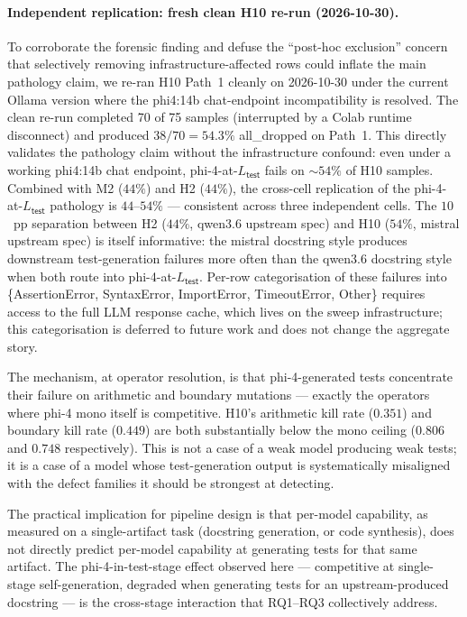 \paragraph{Independent replication: fresh clean H10 re-run (2026-10-30).}
To corroborate the forensic finding and defuse the ``post-hoc exclusion'' concern that selectively removing infrastructure-affected rows could inflate the main pathology claim, we re-ran H10 Path~1 cleanly on 2026-10-30 under the current Ollama version where the phi4:14b chat-endpoint incompatibility is resolved. The clean re-run completed 70 of 75 samples (interrupted by a Colab runtime disconnect) and produced $38/70 = 54.3\%$ \textsf{all\_dropped} on Path~1. This directly validates the pathology claim without the infrastructure confound: even under a working phi4:14b chat endpoint, phi-4-at-$L_{\textsf{test}}$ fails on $\sim$$54\%$ of H10 samples. Combined with M2 ($44\%$) and H2 ($44\%$), the cross-cell replication of the phi-4-at-$L_{\textsf{test}}$ pathology is $44$--$54\%$ --- consistent across three independent cells. The $10$~pp separation between H2 ($44\%$, qwen3.6 upstream spec) and H10 ($54\%$, mistral upstream spec) is itself informative: the mistral docstring style produces downstream test-generation failures more often than the qwen3.6 docstring style when both route into phi-4-at-$L_{\textsf{test}}$. Per-row categorisation of these failures into \{AssertionError, SyntaxError, ImportError, TimeoutError, Other\} requires access to the full LLM response cache, which lives on the sweep infrastructure; this categorisation is deferred to future work and does not change the aggregate story.

The mechanism, at operator resolution, is that phi-4-generated tests concentrate their failure on arithmetic and boundary mutations --- exactly the operators where phi-4 mono itself is competitive. H10's arithmetic kill rate ($0.351$) and boundary kill rate ($0.449$) are both substantially below the mono ceiling ($0.806$ and $0.748$ respectively). This is not a case of a weak model producing weak tests; it is a case of a model whose test-generation output is systematically misaligned with the defect families it should be strongest at detecting.

The practical implication for pipeline design is that per-model capability, as measured on a single-artifact task (docstring generation, or code synthesis), does not directly predict per-model capability at generating tests for that same artifact. The phi-4-in-test-stage effect observed here --- competitive at single-stage self-generation, degraded when generating tests for an upstream-produced docstring --- is the cross-stage interaction that RQ1--RQ3 collectively address.

